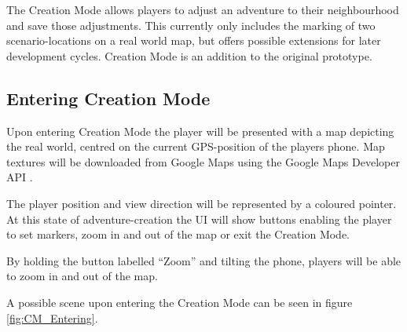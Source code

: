 \documentclass{sigchi-ext}
\begin{document}
The Creation Mode allows players to adjust an adventure to their neighbourhood and save those adjustments. This currently only includes the marking of two scenario-locations on a real world map, but offers possible extensions for later development cycles. Creation Mode is an addition to the original prototype.

\subsection{Entering Creation Mode}

Upon entering Creation Mode the player will be presented with a map depicting the real world, centred on the current GPS-position of the players phone. Map textures will be downloaded from Google Maps \cite{googlemaps} using the Google Maps Developer API \cite{googlemapsAPI}.

The player position and view direction will be represented by a coloured pointer. At this state of adventure-creation the UI will show buttons enabling the player to set markers, zoom in and out of the map or exit the Creation Mode.

By holding the button labelled ``Zoom'' and tilting the phone, players will be able to zoom in and out of the map.

A possible scene upon entering the Creation Mode can be seen in figure \ref{fig:CM_Entering}.
\end{document}
